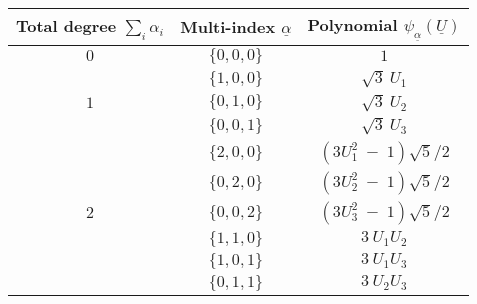 {\begin{center}
  \begin{tabular}{ccc}
    \hline 
    Total degree $\sum_i \alpha_i$ & Multi-index $\underline{\alpha}$ & Polynomial $\psi_{\underline{\alpha}}(\underline{U})$ \\
    \hline
    $0$    & $\{0,0,0\}$                      & $1$                      \\ 
    \hline
           & $\{1,0,0\}$                      & $\sqrt{3}~U_1$                     \\
       $1$    & $\{0,1,0\}$                      & $\sqrt{3}~U_2$                     \\
           & $\{0,0,1\}$                      & $\sqrt{3}~U_3$                     \\
    \hline
        & $\{2,0,0\}$                      & $(3 U_1^2 \; - \; 1) \sqrt{5}/2$ \\
           & $\{0,2,0\}$                      & $(3 U_2^2 \; - \; 1) \sqrt{5}/2$ \\
      $2$     & $\{0,0,2\}$                      & $(3 U_3^2 \; - \; 1) \sqrt{5}/2$ \\
           & $\{1,1,0\}$                      & $3~U_1 U_2$ \\
           & $\{1,0,1\}$                      & $3~U_1 U_3$ \\
           & $\{0,1,1\}$                      & $3~U_2 U_3$ \\
    \hline 
 \end{tabular} 
\end{center}

}


